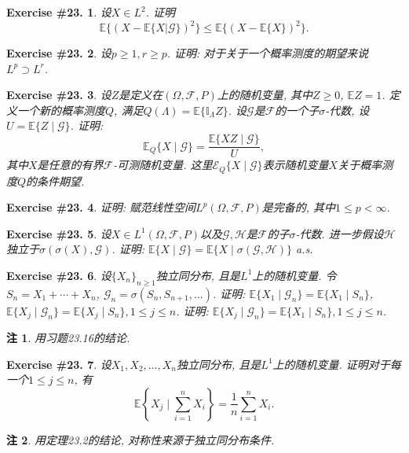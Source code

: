 \documentclass[UTF8, a4paper]{article}
\newtheorem{exercise}{Exercise \#23.}
\newtheorem*{remark}{注}
\begin{document}
\begin{exercise}
    设\(X \in L^2\). 证明 $$\mathbb{E}\{(X-\mathbb{E}\{X|\mathcal{G}\})^2\}\leq \mathbb{E}\{(X-\mathbb{E}\{X\})^2\}.$$
\end{exercise}




\begin{exercise}
设\(p \geq 1, r \geq p\).
证明: 对于关于一个概率测度的期望来说\(L^p \supset L^r\). 
\end{exercise}



\begin{exercise}
设\(Z\)是定义在\((\Omega, \mathcal{F}, P)\)上的随机变量, 其中\(Z \geq 0\), \(\mathbb{E}Z = 1\).
定义一个新的概率测度\(Q\), 满足\(Q(\Lambda) = \mathbb{E}\{\mathbb{I}_{\Lambda} Z\}\).
设\(\mathcal{G}\)是\(\mathcal{F}\)的一个子\(\sigma\)-代数, 设\(U = \mathbb{E}\{Z\mid \mathcal{G}\}\).
证明: 
$$
\mathbb{E}_Q\{X \mid \mathcal{G}\} = \frac{\mathbb{E}\{XZ\mid \mathcal{G}\}}{U}, 
$$
其中\(X\)是任意的有界\(\mathcal{F}\)-可测随机变量.
这里\(\mathcal{E}_Q\{X\mid \mathcal{G}\}\)表示随机变量\(X\)关于概率测度\(Q\)的条件期望.
\end{exercise}




\begin{exercise}
证明: 赋范线性空间\(L^p(\Omega, \mathcal{F}, P)\)是完备的, 其中\(1\leq p < \infty\).
\end{exercise}



\begin{exercise}
设\(X \in L^1(\Omega, \mathcal{F}, P)\)以及\(\mathcal{G}, \mathcal{H}\)是\(\mathcal{F}\)的子\(\sigma\)-代数.
进一步假设\(\mathcal{H}\)独立于\(\sigma(\sigma(X), \mathcal{G})\).
证明: \(\mathbb{E}\{X\mid \mathcal{G}\} = \mathbb{E}\{X\mid \sigma(\mathcal{G}, \mathcal{H})\}\) a.s.
\end{exercise}


\begin{exercise}
设\(\{X_n\}_{n\geq 1}\)独立同分布, 且是\(L^1\)上的随机变量.
令\(S_n = X_1 + \cdots + X_n\), \(\mathcal{G}_n = \sigma(S_n, S_{n+1}, ...)\).
证明: \(\mathbb{E}\{X_1 \mid \mathcal{G}_n\} = \mathbb{E}\{X_1 \mid S_n\}\), \(\mathbb{E}\{X_j \mid \mathcal{G}_n\} = \mathbb{E}\{X_j \mid S_n\}, 1 \leq j \leq n\).
证明: \(\mathbb{E}\{X_j \mid \mathcal{G}_n\} = \mathbb{E}\{X_1 \mid S_n\}, 1 \leq j \leq n\).
\end{exercise}
\begin{remark}
用习题23.16的结论.
\end{remark}



\begin{exercise}
设\(X_1, X_2, ..., X_n\)独立同分布, 且是\(L^1\)上的随机变量.
证明对于每一个\(1 \leq j\leq n\), 有
$$
\mathbb{E}\left\{X_j \mid \sum_{i = 1}^{n}X_i\right\} = \frac{1}{n} \sum_{i = 1}^{n} X_i.
$$
\end{exercise}

\begin{remark}
用定理23.2的结论, 对称性来源于独立同分布条件.
\end{remark}



\end{document}
